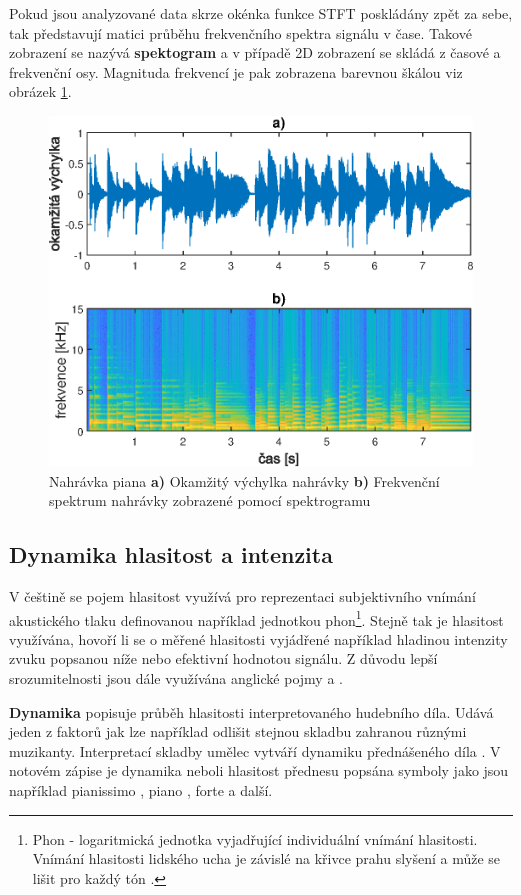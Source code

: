   Pokud jsou analyzované data skrze okénka funkce \acs{STFT} poskládány zpět za sebe, tak představují matici průběhu frekvenčního spektra signálu v čase.
  Takové zobrazení se nazývá \textbf{spektogram} a v případě 2D zobrazení se skládá z časové a frekvenční osy.
  Magnituda frekvencí je pak zobrazena barevnou škálou viz obrázek \ref{fig:Spectrogram}.

  \begin{figure}[H]
    \centering
    \includegraphics[width = 0.8\linewidth]{obrazky/Spectrogam.eps}
    \caption{Nahrávka piana \textbf{a)} Okamžitý výchylka nahrávky \textbf{b)} Frekvenční spektrum nahrávky zobrazené pomocí spektrogramu}
    \label{fig:Spectrogram}
  \end{figure}

  \subsection{Dynamika hlasitost a intenzita} \label{sec:Dynamika}
  V češtině se pojem hlasitost využívá pro reprezentaci subjektivního vnímání akustického tlaku definovanou například jednotkou phon\footnote{Phon - logaritmická jednotka vyjadřující individuální vnímání hlasitosti. Vnímání hlasitosti lidského ucha je závislé na křivce prahu slyšení a může se lišit pro každý tón \cite{tumarkin_1950}.}. 
  Stejně tak je hlasitost využívána, hovoří li se o měřené hlasitosti vyjádřené například hladinou intenzity zvuku popsanou níže nebo efektivní hodnotou signálu.
  Z důvodu lepší srozumitelnosti jsou dále využívána anglické pojmy  a . 
  
  \textbf{Dynamika} popisuje průběh hlasitosti  interpretovaného hudebního díla. Udává jeden z faktorů jak lze například odlišit stejnou skladbu zahranou různými muzikanty. Interpretací skladby umělec vytváří dynamiku přednášeného díla \cite{fundamental_of_music_processing}.
  V notovém zápise je dynamika neboli hlasitost přednesu popsána symboly jako jsou například pianissimo , piano , forte  a další.

